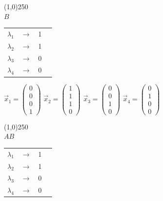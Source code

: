 \documentclass[12pt]{scrreprt}
\begin{document}
  \begin{center}
  \line(1,0){250}\\
  \textbf{$B$}
  \end{center}

  \begin{center}
  \begin{tabular}{ c c c p{5cm} }
    $\lambda_1$ & $\rightarrow$ & 1 \\        
    $\lambda_2$ & $\rightarrow$ & 1 \\
    $\lambda_3$ & $\rightarrow$ & 0 \\
    $\lambda_4$ & $\rightarrow$ & 0 \\
  \end{tabular}
  \end{center}

  \begin{center}
  $\vec{x}_1 = \begin{pmatrix}0\\ 0 \\ 0 \\ 1 \end{pmatrix}$
  $\vec{x}_2 = \begin{pmatrix}1\\ 1 \\ 1 \\ 0 \end{pmatrix}$
  $\vec{x}_3 = \begin{pmatrix}0\\ 0 \\ 1 \\ 0 \end{pmatrix}$
  $\vec{x}_4 = \begin{pmatrix}0\\ 1 \\ 0 \\ 0 \end{pmatrix}$
  \end{center}

  \begin{center}
  \line(1,0){250}\\
  \textbf{$AB$}
  \end{center}

  \begin{center}
  \begin{tabular}{ c c c p{5cm} }
    $\lambda_1$ & $\rightarrow$ & 1 \\        
    $\lambda_2$ & $\rightarrow$ & 1 \\
    $\lambda_3$ & $\rightarrow$ & 0 \\
    $\lambda_4$ & $\rightarrow$ & 0 \\
  \end{tabular}
  \end{center}
\end{document}
